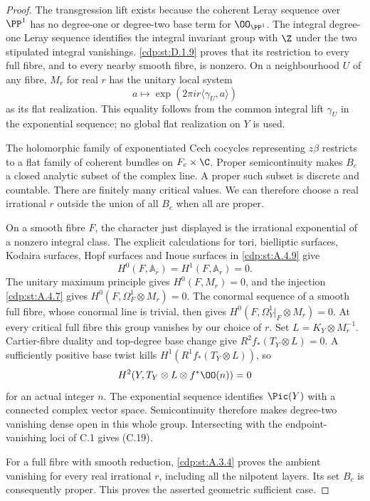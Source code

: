 \begin{proof}
The transgression lift exists because the coherent Leray sequence over $\PP^1$ has no degree-one or degree-two base term for $\OO_{\PP^1}$. The integral degree-one Leray sequence identifies the integral invariant group with $\Z$ under the two stipulated integral vanishings. \ref{cdp:st:D.1.9} proves that its restriction to every full fibre, and to every nearby smooth fibre, is nonzero. On a neighbourhood $U$ of any fibre, $M_r$ for real $r$ has the unitary local system
\[
 a\longmapsto\exp(2\pi i r\langle\gamma_U,a\rangle)
\]
as its flat realization. This equality follows from the common integral lift $\gamma_U$ in the exponential sequence; no global flat realization on $Y$ is used.

The holomorphic family of exponentiated Cech cocycles representing $z\beta$ restricts to a flat family of coherent bundles on $F_c\times\C$. Proper semicontinuity makes $B_c$ a closed analytic subset of the complex line. A proper such subset is discrete and countable. There are finitely many critical values. We can therefore choose a real irrational $r$ outside the union of all $B_c$ when all are proper.

On a smooth fibre $F$, the character just displayed is the irrational exponential of a nonzero integral class. The explicit calculations for tori, bielliptic surfaces, Kodaira surfaces, Hopf surfaces and Inoue surfaces in \ref{cdp:st:A.4.9} give
\[
 H^0(F,\mathbb A_r)=H^1(F,\mathbb A_r)=0.
\]
The unitary maximum principle gives $H^0(F,M_r)=0$, and the injection \ref{cdp:st:A.4.7} gives $H^0(F,\Omega_F^1\otimes M_r)=0$. The conormal sequence of a smooth full fibre, whose conormal line is trivial, then gives
$H^0(F,\Omega_Y^1|_F\otimes M_r)=0$.
At every critical full fibre this group vanishes by our choice of $r$. Set $L=K_Y\otimes M_r^{-1}$. Cartier-fibre duality and top-degree base change give $R^2f_*(T_Y\otimes L)=0$. A sufficiently positive base twist kills $H^1(R^1f_*(T_Y\otimes L))$, so
\[
 H^2(Y,T_Y\otimes L\otimes f^*\OO(n))=0
\]
for an actual integer $n$. The exponential sequence identifies $\Pic(Y)$ with a connected complex vector space. Semicontinuity therefore makes degree-two vanishing dense open in this whole group. Intersecting with the endpoint-vanishing loci of C.1 gives (C.19).

For a full fibre with smooth reduction, \ref{cdp:st:A.3.4} proves the ambient vanishing for every real irrational $r$, including all the nilpotent layers. Its set $B_c$ is consequently proper. This proves the asserted geometric sufficient case.


\end{proof}
